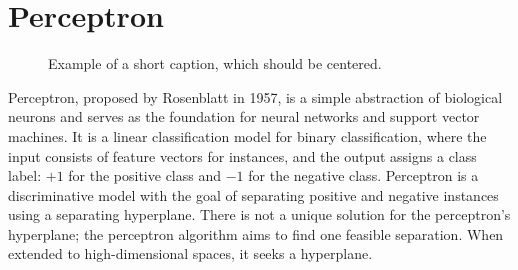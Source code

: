 \documentclass[10pt,twocolumn,letterpaper]{article}
\begin{document}
\section{Perceptron}
\label{sec:perceptron}
\begin{figure}[t]
	\centering
	\caption{Example of a short caption, which should be centered.}
	\label{fig:short}
\end{figure}
Perceptron, proposed by Rosenblatt in 1957, is a simple abstraction of biological neurons and serves as the foundation for neural networks and support vector machines. It is a linear classification model for binary classification, where the input consists of feature vectors for instances, and the output assigns a class label: $+1$ for the positive class and $-1$ for the negative class\cite{rosenblatt1958perceptron}. Perceptron is a discriminative model with the goal of separating positive and negative instances using a separating hyperplane. There is not a unique solution for the perceptron's hyperplane; the perceptron algorithm aims to find one feasible separation. When extended to high-dimensional spaces, it seeks a hyperplane.
\end{document}
